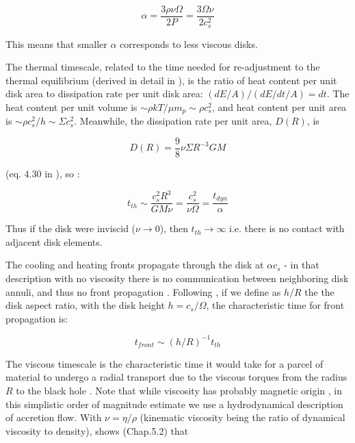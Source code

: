 \documentclass[twocolumn]{aastex62}
\begin{document}
\begin{equation}
\alpha  =   \frac{3 \rho \nu \Omega}{2 P} =  \frac{3 \Omega \nu}{2 c_{s}^{2}}
\end{equation}



This means that smaller $\alpha$ corresponds to less viscous disks. 


The thermal timescale, related to the time needed for re-adjustment to the thermal equilibrium (derived in detail in \citealt{frank2002}), is the ratio of heat content per unit disk area to dissipation rate per unit disk area: $(dE / A) / (dE/dt /  A) = dt $.  The heat content per unit volume is ${\sim} \rho k T / \mu m_{p} {\sim} \rho c_{s}^{2}$, and heat content per unit area is  ${\sim} \rho c_{s}^{2} / h {\sim} \Sigma c_{s}^{2}$. Meanwhile, the dissipation rate per unit area, $D(R)$, is 

\begin{equation}
D(R) = \frac{9}{8} \nu \Sigma R^{-3} G M
\end{equation}

(eq. 4.30 in \citealt{frank2002}), so :

\begin{equation}
t_{th} {\sim} \frac{c_{s}^{2}R^{3}}{G M \nu } = \frac{c_{s}^{2}}{\nu \Omega} = \frac{t_{dyn}}{\alpha}
\end{equation}

Thus if the disk were inviscid ($\nu \rightarrow 0$), then $t_{th}\rightarrow\infty$ i.e. there is no contact with adjacent disk elements. 

The cooling and heating fronts propagate through the disk at  $\alpha c_{s} $ \citep{hameury2009}  - in that description  with no viscosity there is no communication between neighboring disk annuli, and thus no front propagation \citep{balbus1998, balbus2003}. Following \cite{stern2018}, if we define as $h/R$  the the disk aspect ratio, with the disk height $h = c_{s} / \Omega$, the characteristic time for front propagation is:

\begin{equation}
t_{front} {\sim} (h/R) ^ {-1} t_{th}
\end{equation}


The viscous timescale is the characteristic time it would take for a parcel of material to undergo a radial transport due to the viscous torques from the radius $R$ to the black hole \citep{czerny2006}. Note that while viscosity has probably magnetic origin \citep{eardley1975, grzedzielski2017}, in this simplistic order of magnitude estimate we use a hydrodynamical description of accretion flow.  With $\nu = \eta / \rho$ (kinematic viscosity being the ratio of dynamical viscosity to density), \cite{frank2002} shows (Chap.5.2) that 
\end{document}
